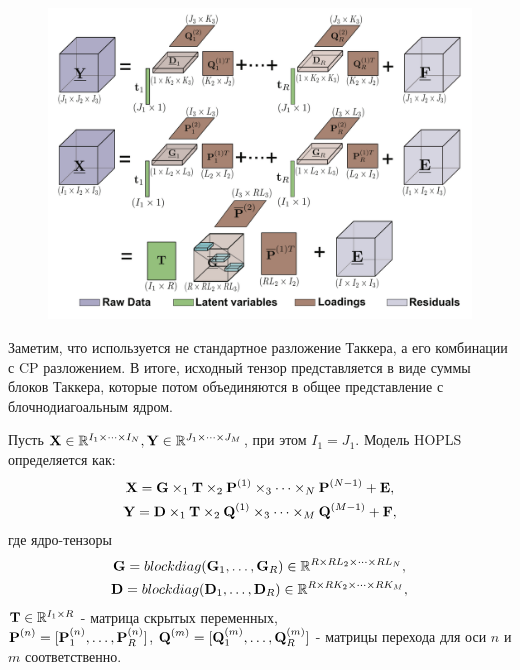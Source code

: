 \begin{figure}
	\centering
	\includegraphics[scale=0.55]{chapters/varenik2/images/hopls.png}
\end{figure}
 
Заметим, что используется не стандартное разложение Таккера, а его комбинации с CP разложением. В итоге, исходный тензор представляется в виде суммы блоков Таккера, которые потом объединяются в общее представление с блочнодиагоальным ядром.

Пусть $\textbf{X} \in \mathbb{R}^{I_1\times \dots \times I_N}, \textbf{Y} \in \mathbb{R}^{J_1\times \dots \times J_M}$, при этом $I_1 = J_1$. Модель HOPLS определяется как: 
\begin{gather*}
    \textbf{X} = \textbf{G} \times_1 \textbf{T} \times_2 \textbf{P}^{(1)} \times_3 \dots \times_N \textbf{P}^{(N-1)} + \textbf{E},\\
    \textbf{Y} = \textbf{D} \times_1 \textbf{T} \times_2 \textbf{Q}^{(1)} \times_3 \dots \times_M \textbf{Q}^{(M-1)} + \textbf{F}, 
\end{gather*}
где ядро-тензоры
\begin{gather*}
    \textbf{G} = blockdiag(\textbf{G}_1, \dots, \textbf{G}_R) \in \mathbb{R}^{R\times RL_2 \times \dots \times RL_N},\\
    \textbf{D} = blockdiag(\textbf{D}_1, \dots, \textbf{D}_R) \in \mathbb{R}^{R\times RK_2 \times \dots \times RK_M},
\end{gather*}
$\textbf{T}\in \mathbb{R}^{I_1\times R}$ - матрица скрытых переменных,\\
$\textbf{P}^{(n)} = [\textbf{P}_1^{(n)}, \dots, \textbf{P}_R^{(n)}]$, $\textbf{Q}^{(m)} = [\textbf{Q}_1^{(m)}, \dots, \textbf{Q}_R^{(m)}]$ - матрицы перехода для оси $n$ и $m$ соответственно.

